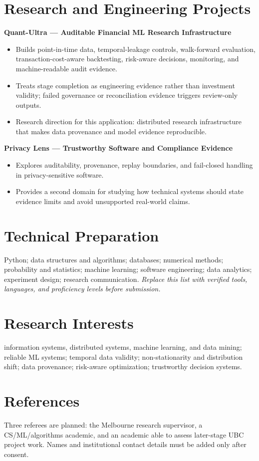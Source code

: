\documentclass[11pt]{article}
\begin{document}
\section*{Research and Engineering Projects}
\textbf{Quant-Ultra --- Auditable Financial ML Research Infrastructure}
\begin{itemize}
\item Builds point-in-time data, temporal-leakage controls, walk-forward evaluation, transaction-cost-aware backtesting, risk-aware decisions, monitoring, and machine-readable audit evidence.
\item Treats stage completion as engineering evidence rather than investment validity; failed governance or reconciliation evidence triggers review-only outputs.
\item Research direction for this application: distributed research infrastructure that makes data provenance and model evidence reproducible.
\end{itemize}

\textbf{Privacy Lens --- Trustworthy Software and Compliance Evidence}
\begin{itemize}
\item Explores auditability, provenance, replay boundaries, and fail-closed handling in privacy-sensitive software.
\item Provides a second domain for studying how technical systems should state evidence limits and avoid unsupported real-world claims.
\end{itemize}

\section*{Technical Preparation}
Python; data structures and algorithms; databases; numerical methods; probability and statistics; machine learning; software engineering; data analytics; experiment design; research communication. \textit{Replace this list with verified tools, languages, and proficiency levels before submission.}

\section*{Research Interests}
information systems, distributed systems, machine learning, and data mining; reliable ML systems; temporal data validity; non-stationarity and distribution shift; data provenance; risk-aware optimization; trustworthy decision systems.

\section*{References}
Three referees are planned: the Melbourne research supervisor, a CS/ML/algorithms academic, and an academic able to assess later-stage UBC project work. Names and institutional contact details must be added only after consent.
\end{document}
